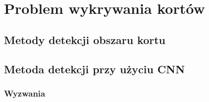 \chapter{Problem wykrywania kortów}

\section{Metody detekcji obszaru kortu}

\section{Metoda detekcji przy użyciu CNN}

\subsection{Wyzwania}
